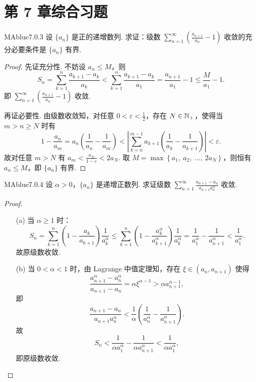 \section*{第 7 章综合习题}

\begin{problem}{MAblue}{7.0.3}
    设 $\{ a_n \}$ 是正的递增数列. 求证：级数 $\sum_{n=1}^\infty \left( \frac{a_{n+1}}{a_n} - 1 \right)$ 收敛的充分必要条件是 $\{ a_n \}$ 有界.
\end{problem}

\begin{proof}
    先证充分性. 不妨设 $a_n \leqslant M$，则
    \[
        S_n = \sum_{k=1}^n \frac{a_{k+1} - a_k}{a_k} < \sum_{k=1}^n \frac{a_{k+1} - a_k}{a_1} = \frac{a_{n+1}}{a_1} - 1 \leqslant \frac M {a_1} - 1.
    \]
    即 $\sum_{n=1}^{\infty} \left( \frac{a_{n+1}}{a_n} - 1 \right)$ 收敛.

    {\flushleft 再证必要性. 由级数收敛知，对任意 $0 < \varepsilon < \frac 1 2$，存在 $N \in \mathbb N_+$，使得当 $m > n \geqslant N$ 时有}
    \[
        1 - \frac{a_n}{a_{m}} = a_n \left( \frac 1 {a_n} - \frac 1 {a_m} \right) < \left| \sum_{k=n}^{m-1} a_{k+1} \left( \frac 1 {a_k} - \frac 1 {a_{k+1}} \right) \right| < \varepsilon.
    \]
    故对任意 $m > N$ 有 $a_m < \frac{a_N}{1 - \varepsilon} < 2a_N$. 取 $M = \max\left\{ a_1,\ a_2,\ \ldots,\ 2a_N \right\}$，则恒有 $a_n \leqslant M$，即 $\{ a_n \}$ 有界.
\end{proof}

\begin{problem}{MAblue}{7.0.4}
    设 $\alpha > 0$，$\{ a_n \}$ 是递增正数列. 求证级数 $\sum_{n=1}^\infty \frac{a_{n+1}-a_n}{a_{n+1}a_n^\alpha}$ 收敛.
\end{problem}

\begin{proof}
    \leavevmode
    \begin{enumerate}
        \item[(a)] 当 $\alpha \geqslant 1$ 时：
        \[
            S_n = \sum_{k=1}^n \left( 1 - \frac{a_k}{a_{k+1}} \right) \frac 1 {a_k^{\alpha}} \leqslant \sum_{k=1}^n \left( 1 - \frac{a_k^{\alpha}}{a_{k+1}^{\alpha}} \right) \frac 1 {a_k^{\alpha}} = \frac 1 {a_1^{\alpha}} - \frac 1 {a_{n+1}^{\alpha}} < \frac 1 {a_1^{\alpha}}.
        \]
        故原级数收敛.
        \item[(b)] 当 $0 < \alpha < 1$ 时，由 Lagrange 中值定理知，存在 $\xi \in (a_n, a_{n+1})$ 使得
        \[
            \frac{a_{n+1}^{\alpha} - a_n^{\alpha}}{a_{n+1} - a_n} = \alpha \xi^{\alpha - 1} > \alpha a_{n+1}^{\alpha - 1},
        \]
        即
        \[
            \frac{a_{n+1} - a_n}{a_{n+1} a_n^{\alpha}} < \frac 1 {\alpha} \left( \frac 1 {a_n^{\alpha}} - \frac 1 {a_{n+1}^{\alpha}} \right).
        \]
        故
        \[
            S_n < \frac 1 {\alpha a_1^{\alpha}}  - \frac 1 {\alpha a_{n+1}^{\alpha}} < \frac 1 {\alpha a_1^{\alpha}},
        \]
        即原级数收敛. \qedhere
    \end{enumerate}
\end{proof}

